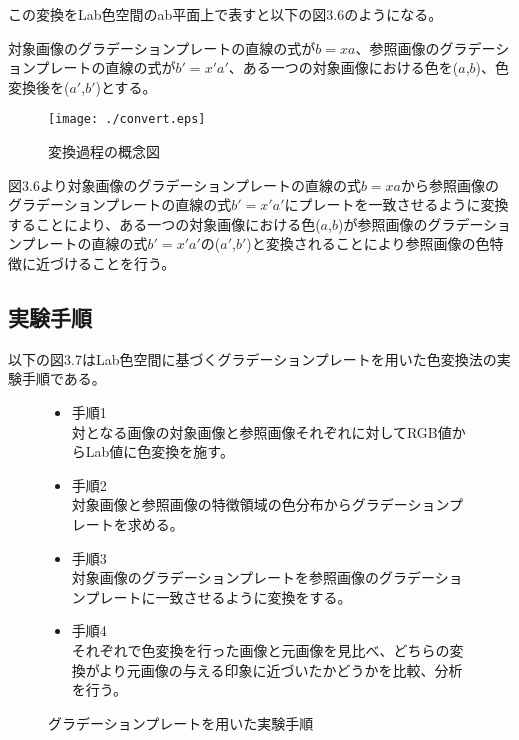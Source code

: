 \newpage
この変換をLab色空間のab平面上で表すと以下の図3.6のようになる。\par
対象画像のグラデーションプレートの直線の式が$b=xa$、参照画像のグラデーションプレートの直線の式が$b'=x'a'$、ある一つの対象画像における色を($a$,$b$)、色変換後を($a'$,$b'$)とする。\par
\begin{figure}[htbp]
  \begin{center}
    \texttt{[image: ./convert.eps]}
    \caption{変換過程の概念図}
    \label{fig:lab_gainen}
  \end{center}
\end{figure}
図3.6より対象画像のグラデーションプレートの直線の式$b=xa$から参照画像のグラデーションプレートの直線の式$b'=x'a'$にプレートを一致させるように変換することにより、ある一つの対象画像における色($a$,$b$)が参照画像のグラデーションプレートの直線の式$b'=x'a'$の($a'$,$b'$)と変換されることにより参照画像の色特徴に近づけることを行う。
\newpage
\subsection{実験手順}
以下の図3.7はLab色空間に基づくグラデーションプレートを用いた色変換法の実験手順である。
\begin{figure}[htbp]
\begin{shadebox}
\begin{itemize}
\item 手順1 \\
対となる画像の対象画像と参照画像それぞれに対してRGB値からLab値に色変換を施す。
\item 手順2 \\
対象画像と参照画像の特徴領域の色分布からグラデーションプレートを求める。
\item 手順3 \\
対象画像のグラデーションプレートを参照画像のグラデーションプレートに一致させるように変換をする。
\item 手順4 \\
 それぞれで色変換を行った画像と元画像を見比べ、どちらの変換がより元画像の与える印象に近づいたかどうかを比較、分析を行う。

 
\label{fig:tezyun2}
\end{itemize}
\end{shadebox}
\caption{グラデーションプレートを用いた実験手順}
\end{figure}
